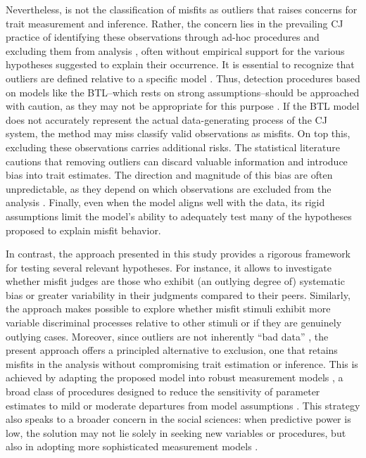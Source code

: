 \documentclass[
  authoryear,
  review,
  1p]{elsarticle}
\begin{document}
Nevertheless, is not the classification of misfits as outliers that
raises concerns for trait measurement and inference. Rather, the concern
lies in the prevailing CJ practice of identifying these observations
through ad-hoc procedures and excluding them from analysis
\citep{Pollitt_2012a, Pollitt_2012b}, often without empirical support
for the various hypotheses suggested to explain their occurrence. It is
essential to recognize that outliers are defined relative to a specific
model \citep{McElreath_2020}. Thus, detection procedures based on models
like the BTL--which rests on strong assumptions--should be approached
with caution, as they may not be appropriate for this purpose
\citep{Kelly_et_al_2022}. If the BTL model does not accurately represent
the actual data-generating process of the CJ system, the method may miss
classify valid observations as misfits. On top this, excluding these
observations carries additional risks. The statistical literature
cautions that removing outliers can discard valuable information
\citep{Miller_2023} and introduce bias into trait estimates. The
direction and magnitude of this bias are often unpredictable, as they
depend on which observations are excluded from the analysis
\citep{Zimmerman_1994, OHagan_2018, McElreath_2020}. Finally, even when
the model aligns well with the data, its rigid assumptions limit the
model's ability to adequately test many of the hypotheses proposed to
explain misfit behavior.

In contrast, the approach presented in this study provides a rigorous
framework for testing several relevant hypotheses. For instance, it
allows to investigate whether misfit judges are those who exhibit (an
outlying degree of) systematic bias or greater variability in their
judgments compared to their peers. Similarly, the approach makes
possible to explore whether misfit stimuli exhibit more variable
discriminal processes relative to other stimuli or if they are genuinely
outlying cases. Moreover, since outliers are not inherently ``bad data''
\citep{McElreath_2020}, the present approach offers a principled
alternative to exclusion, one that retains misfits in the analysis
without compromising trait estimation or inference. This is achieved by
adapting the proposed model into robust measurement models
\citep{McElreath_2020}, a broad class of procedures designed to reduce
the sensitivity of parameter estimates to mild or moderate departures
from model assumptions \citep{Everitt_et_al_2010}. This strategy also
speaks to a broader concern in the social sciences: when predictive
power is low, the solution may not lie solely in seeking new variables
or procedures, but also in adopting more sophisticated measurement
models \citep{Wainer_et_al_1978}.
\end{document}
